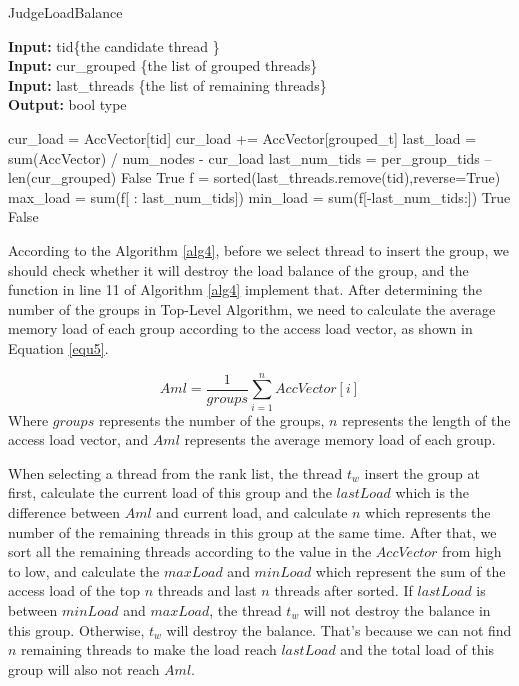 \documentclass[a4paper,fleqn]{cas-sc}
\begin{document}
\begin{algorithm}
\caption{JudgeLoadBalance}  \label{alg5} %
\hspace*{0.02in} {\bf Input:} tid\{the candidate thread \} \\
\hspace*{0.02in} {\bf Input:} cur\_grouped \{the list of grouped threads\} \\
\hspace*{0.02in} {\bf Input:} last\_threads \{the list of remaining threads\} \\
\hspace*{0.02in} {\bf Output:} %
bool type
\begin{algorithmic}[1]
\State cur\_load = AccVector[tid]
\State cur\_load += AccVector[grouped\_t]
\EndFor
\State last\_load = sum(AccVector) / num\_nodes - cur\_load
\State last\_num\_tids = per\_group\_tids – len(cur\_grouped)
\State\Return False
\Else
\State\Return True
\EndIf
\State f = sorted(last\_threads.remove(tid),reverse=True)
\State max\_load = sum(f[ : last\_num\_tids])
\State min\_load = sum(f[-last\_num\_tids:])
\State\Return True
\Else
\State\Return False
\EndIf
\end{algorithmic}
\end{algorithm}

According to the Algorithm  \ref{alg4}, before we select  thread to insert the group, we should check whether it will destroy the load balance of the group, and the function in line 11 of Algorithm  \ref{alg4} implement that. After determining the number of the groups in Top-Level Algorithm, we need to calculate the average memory load of each group according to the access load vector, as shown in Equation \ref{equ5}.

\begin{equation} \label{equ5}
	Aml =  \frac{1}{groups}\sum_{i=1}^{n}AccVector[i]
\end{equation}Where $groups$ represents the number of the groups, $n$ represents the length of the access load vector, and $Aml$ represents the average memory load of each group. 

When selecting a thread from the rank list, the thread $t_w$ insert the group at first, calculate the current load of this group and the $lastLoad$ which is the difference between $Aml$ and current load, and calculate $n$ which represents the number of the remaining threads in this group at the same time. After that, we sort all the remaining threads according to the value in the $AccVector$ from high to low, and calculate the $maxLoad$ and $minLoad$ which represent the sum of the access load of  the top $n$ threads and last $n$ threads after sorted. If $lastLoad$ is between $minLoad$ and $maxLoad$, the thread $t_w$ will not destroy the balance in this group. Otherwise, $t_w$ will destroy the balance. That’s because we can not find $n$ remaining threads to make the load reach $lastLoad$ and the total load of this group will also  not reach $Aml$. 
\end{document}
